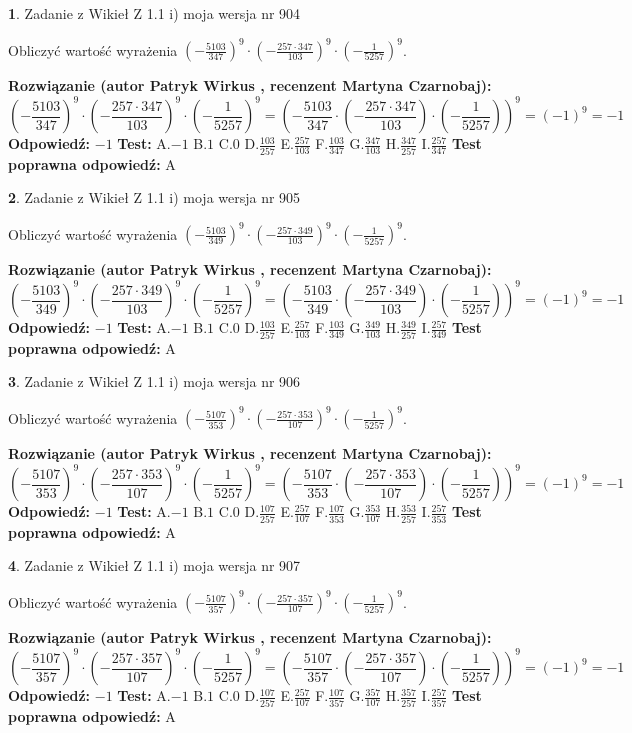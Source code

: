 \documentclass[12pt, a4paper]{article}
\theoremstyle{definition} %
\newtheorem{zad}{}
\newcommand{\zadStart}[1]{\begin{zad}#1\newline}
\newcommand{\zadStop}{\end{zad}}
\newcommand{\rozwStart}[2]{\noindent \textbf{Rozwiązanie (autor #1 , recenzent #2): }\newline}
\newcommand{\rozwStop}{\newline}
\newcommand{\odpStart}{\noindent \textbf{Odpowiedź:}\newline}
\newcommand{\odpStop}{\newline}
\newcommand{\testStart}{\noindent \textbf{Test:}\newline}
\newcommand{\testStop}{\newline}
\newcommand{\kluczStart}{\noindent \textbf{Test poprawna odpowiedź:}\newline}
\newcommand{\kluczStop}{\newline}
\begin{document}
\zadStart{Zadanie z Wikieł Z 1.1 i) moja wersja nr 904}

Obliczyć wartość wyrażenia $(-\frac{5103}{347})^{9} \cdot (-\frac{257 \cdot 347}{103})^{9} \cdot (-\frac{1}{5257})^{9}$.
\zadStop
\rozwStart{Patryk Wirkus}{Martyna Czarnobaj}
$$(-\frac{5103}{347})^{9} \cdot (-\frac{257 \cdot 347}{103})^{9} \cdot (-\frac{1}{5257})^{9} = (-\frac{5103}{347} \cdot (-\frac{257 \cdot 347}{103}) \cdot (-\frac{1}{5257}))^{9} = (-1)^{9} = -1$$
\rozwStop
\odpStart
$-1$
\odpStop
\testStart
A.$-1$ B.$1$ C.$0$ D.$\frac{103}{257}$ E.$\frac{257}{103}$
F.$\frac{103}{347}$ G.$\frac{347}{103}$
H.$\frac{347}{257}$
I.$\frac{257}{347}$
\testStop
\kluczStart
A
\kluczStop



\zadStart{Zadanie z Wikieł Z 1.1 i) moja wersja nr 905}

Obliczyć wartość wyrażenia $(-\frac{5103}{349})^{9} \cdot (-\frac{257 \cdot 349}{103})^{9} \cdot (-\frac{1}{5257})^{9}$.
\zadStop
\rozwStart{Patryk Wirkus}{Martyna Czarnobaj}
$$(-\frac{5103}{349})^{9} \cdot (-\frac{257 \cdot 349}{103})^{9} \cdot (-\frac{1}{5257})^{9} = (-\frac{5103}{349} \cdot (-\frac{257 \cdot 349}{103}) \cdot (-\frac{1}{5257}))^{9} = (-1)^{9} = -1$$
\rozwStop
\odpStart
$-1$
\odpStop
\testStart
A.$-1$ B.$1$ C.$0$ D.$\frac{103}{257}$ E.$\frac{257}{103}$
F.$\frac{103}{349}$ G.$\frac{349}{103}$
H.$\frac{349}{257}$
I.$\frac{257}{349}$
\testStop
\kluczStart
A
\kluczStop



\zadStart{Zadanie z Wikieł Z 1.1 i) moja wersja nr 906}

Obliczyć wartość wyrażenia $(-\frac{5107}{353})^{9} \cdot (-\frac{257 \cdot 353}{107})^{9} \cdot (-\frac{1}{5257})^{9}$.
\zadStop
\rozwStart{Patryk Wirkus}{Martyna Czarnobaj}
$$(-\frac{5107}{353})^{9} \cdot (-\frac{257 \cdot 353}{107})^{9} \cdot (-\frac{1}{5257})^{9} = (-\frac{5107}{353} \cdot (-\frac{257 \cdot 353}{107}) \cdot (-\frac{1}{5257}))^{9} = (-1)^{9} = -1$$
\rozwStop
\odpStart
$-1$
\odpStop
\testStart
A.$-1$ B.$1$ C.$0$ D.$\frac{107}{257}$ E.$\frac{257}{107}$
F.$\frac{107}{353}$ G.$\frac{353}{107}$
H.$\frac{353}{257}$
I.$\frac{257}{353}$
\testStop
\kluczStart
A
\kluczStop



\zadStart{Zadanie z Wikieł Z 1.1 i) moja wersja nr 907}

Obliczyć wartość wyrażenia $(-\frac{5107}{357})^{9} \cdot (-\frac{257 \cdot 357}{107})^{9} \cdot (-\frac{1}{5257})^{9}$.
\zadStop
\rozwStart{Patryk Wirkus}{Martyna Czarnobaj}
$$(-\frac{5107}{357})^{9} \cdot (-\frac{257 \cdot 357}{107})^{9} \cdot (-\frac{1}{5257})^{9} = (-\frac{5107}{357} \cdot (-\frac{257 \cdot 357}{107}) \cdot (-\frac{1}{5257}))^{9} = (-1)^{9} = -1$$
\rozwStop
\odpStart
$-1$
\odpStop
\testStart
A.$-1$ B.$1$ C.$0$ D.$\frac{107}{257}$ E.$\frac{257}{107}$
F.$\frac{107}{357}$ G.$\frac{357}{107}$
H.$\frac{357}{257}$
I.$\frac{257}{357}$
\testStop
\kluczStart
A
\kluczStop
\end{document}

